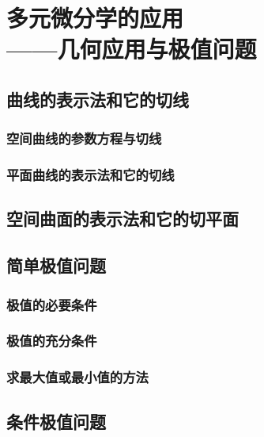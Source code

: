 

\chapter{多元微分学的应用\\——几何应用与极值问题}\label{ch:18}
\section{曲线的表示法和它的切线}
\subsection{空间曲线的参数方程与切线}
\subsection{平面曲线的表示法和它的切线}
\begin{exercise}

\end{exercise}
\section{空间曲面的表示法和它的切平面}
\begin{exercise}

\end{exercise}
\section{简单极值问题}
\subsection{极值的必要条件}
\subsection{极值的充分条件}
\subsection{求最大值或最小值的方法}
\begin{exercise}

\end{exercise}
\section{条件极值问题}
